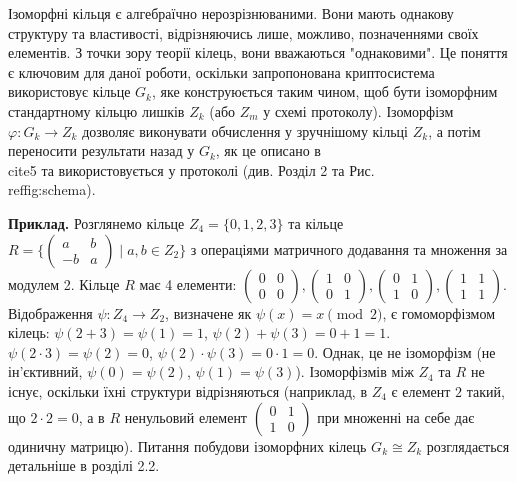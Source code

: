 \documentclass[a4paper,12pt]{article}
\begin{document}
    Ізоморфні кільця є алгебраїчно нерозрізнюваними. Вони мають однакову структуру та властивості, відрізняючись лише, можливо, позначеннями своїх елементів. З точки зору теорії кілець, вони вважаються "однаковими". Це поняття є ключовим для даної роботи, оскільки запропонована криптосистема використовує кільце \(G_k\), яке конструюється таким чином, щоб бути ізоморфним стандартному кільцю лишків \(Z_k\) (або \(Z_m\) у схемі протоколу). Ізоморфізм \(\varphi: G_k \to Z_k\) дозволяє виконувати обчислення у зручнішому кільці \(Z_k\), а потім переносити результати назад у \(G_k\), як це описано в \\cite{5} та використовується у протоколі (див. Розділ 2 та Рис.~\\ref{fig:schema}).

    \textbf{Приклад.} Розглянемо кільце \(Z_4 = \{0, 1, 2, 3\}\) та кільце \(R = \{ \begin{pmatrix}
                                                                                        a & b \\ -b & a
    \end{pmatrix} \mid a, b \in Z_2 \}\) з операціями матричного додавання та множення за модулем 2.
    Кільце \(R\) має 4 елементи:
    \( \begin{pmatrix}
           0 & 0 \\ 0 & 0
    \end{pmatrix}, \begin{pmatrix}
                       1 & 0 \\ 0 & 1
    \end{pmatrix}, \begin{pmatrix}
                       0 & 1 \\ 1 & 0
    \end{pmatrix}, \begin{pmatrix}
                       1 & 1 \\ 1 & 1
    \end{pmatrix} \).
    Відображення \(\psi: Z_4 \to Z_2\), визначене як \(\psi(x) = x \pmod 2\), є гомоморфізмом кілець:
    \(\psi(2+3) = \psi(1) = 1\), \(\psi(2)+\psi(3) = 0+1 = 1\).
    \(\psi(2 \cdot 3) = \psi(2) = 0\), \(\psi(2)\cdot\psi(3) = 0 \cdot 1 = 0\).
    Однак, це не ізоморфізм (не ін'єктивний, \(\psi(0)=\psi(2)\), \(\psi(1)=\psi(3)\)).
    Ізоморфізмів між \(Z_4\) та \(R\) не існує, оскільки їхні структури відрізняються (наприклад, в \(Z_4\) є елемент \(2\) такий, що \(2 \cdot 2 = 0\), а в \(R\) ненульовий елемент \(\begin{pmatrix}
                                                                                                                                                                                            0 & 1 \\ 1 & 0
    \end{pmatrix}\) при множенні на себе дає одиничну матрицю). Питання побудови ізоморфних кілець \(G_k \cong Z_k\) розглядається детальніше в розділі 2.2.
\end{document}
